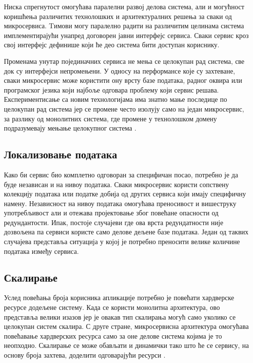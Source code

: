 \documentclass[12pt,oneside]{memoir}
\begin{document}
Ниска спрегнутост омогућава паралелни развој делова система, али и могућност коришћења различитих технолошких и архитектуралних решења за сваки од микросервиса. Tимови могу паралелно радити на различитим целинама система имплементирајући унапред договорен јавни интерфејс сервиса. Сваки сервис кроз свој интерфејс дефинише који ће део система бити доступан кориснику.

Променама унутар појединачних сервиса не мења се целокупан рад система, све док су интерфејси непромењени. У односу на перформансе које су захтеване, сваки микросервис може користити ону врсту базе података, радног оквира или програмског језика који најбоље одговара проблему који сервис решава. Експериментисање са новим технологијама има знатно мање последице по целокупан рад система јер се промене често изолују само на један микросервис, за разлику од монолитних система, где промене у технолошком домену подразумевају мењање целокупног система \cite{microservicesBook}.


\subsection{Локализовање података}

Како би сервис био комплетно одговоран за специфичан посао, потребно је да буде независан и на нивоу података. Сваки микросервис користи сопствену колекцију података или податке добија од других сервиса који имају специфичну намену. Независност на нивоу података омогућава преносивост и вишеструку употребљивост али и отежава пројектовање због повећане опасности од редундантости. Ипак, постоје случајеви где ова врста редундатности није дозвољена па сервиси користе само делове дељене базе података. Један од таквих случајева представља ситуација у којој је потребно преносити велике количине података између сервиса.


\subsection{Скалирање}

Услед повећања броја корисника апликације потребно је повећати хардверске ресурсе додељене систему. Када се користи монолитна архитектура, ово представља велики изазов јер је овакав тип скалирања могућ само уколико се целокупан систем скалира. С друге стране, микросервисна архитектура омогућава повећавање хардверских ресурса само за оне делове система којима је то неопходно. Скалирање се може обављати и динамички тако што ће се сервису, на основу броја захтева, доделити одговарајући ресурси \cite{microservicesBook}.
\end{document}
